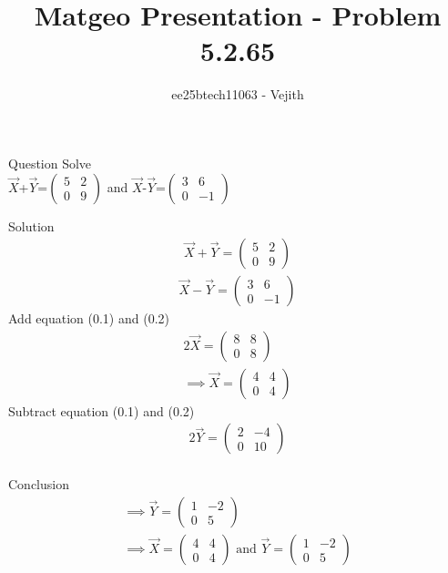 \documentclass{beamer}
\title{Matgeo Presentation - Problem 5.2.65}
\author{ee25btech11063 - Vejith}
\numberwithin{equation}{section}
\theoremstyle{remark}
\begin{document}
\frame{\titlepage}
\begin{frame}{Question}
Solve\\
$\Vec{X}$+$\Vec{Y}$=$\begin{pmatrix}
    5 & 2\\
    0 & 9
\end{pmatrix}$ and $\Vec{X}$-$\Vec{Y}$=$\begin{pmatrix}
    3 & 6\\
    0 & -1
\end{pmatrix}$
\end{frame}

\begin{frame}{Solution}
    \begin{align}
    \Vec{X}+\Vec{Y}=\begin{pmatrix}
    5 & 2\\
    0 & 9
    \end{pmatrix}
\end{align}
\begin{align}
    \Vec{X}-\Vec{Y}=\begin{pmatrix}
    3 & 6\\
    0 & -1
\end{pmatrix}
\end{align}
Add equation (0.1) and (0.2)
\begin{align}
     2\Vec{X}=\begin{pmatrix}
    8 & 8\\
    0 & 8
\end{pmatrix}\\
\implies \Vec{X}=\begin{pmatrix}
    4 & 4\\
    0 & 4
\end{pmatrix}
\end{align}
Subtract equation (0.1) and (0.2)
\begin{align}
    2\Vec{Y}=\begin{pmatrix}
    2 & -4\\
    0 & 10
\end{pmatrix}\\
\end{align}
\end{frame}
\begin{frame}{Conclusion}
    \begin{align}
    \implies \Vec{Y}=\begin{pmatrix}
    1 & -2\\
    0 & 5
\end{pmatrix}\\
    \implies \Vec{X}=\begin{pmatrix}
    4 & 4\\
    0 & 4
\end{pmatrix} \text{ and } \Vec{Y}=\begin{pmatrix}
    1 & -2\\
    0 & 5
\end{pmatrix}
\end{align}

\end{frame}
\end{document}
